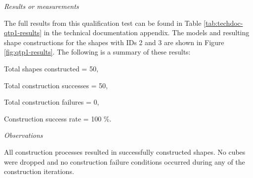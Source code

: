 \textit{Results or measurements}

The full results from this qualification test can be found in Table \ref{tab:techdoc-qtp1-results} in the technical documentation appendix. The models and resulting shape constructions for the shapes with IDs 2 and 3 are shown in Figure \ref{fig:qtp1-results}. The following is a summary of these results:

\begin{compactitem}
	\item Total shapes constructed = 50,
	\item Total construction successes = 50,
	\item Total construction failures = 0,
	\item Construction success rate = 100 \%.
\end{compactitem}

\textit{Observations}

All construction processes resulted in successfully constructed shapes. No cubes were dropped and no construction failure conditions occurred during any of the construction iterations.

